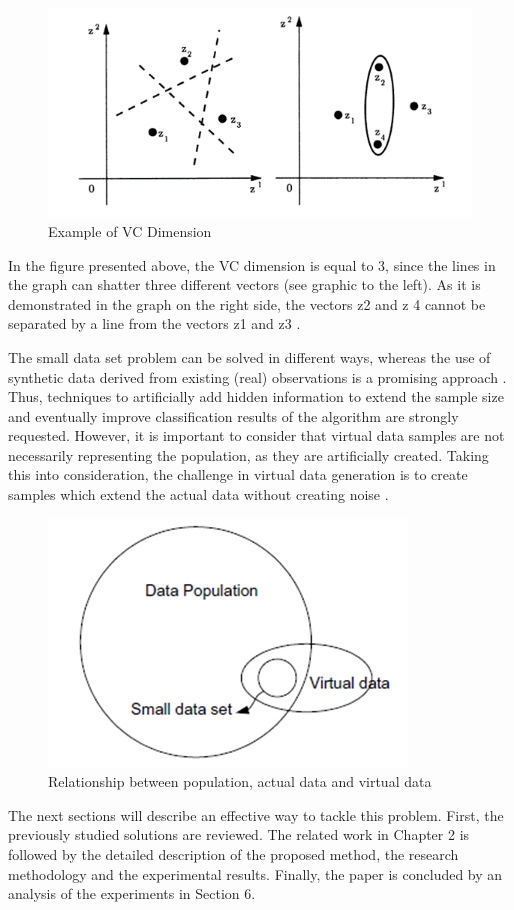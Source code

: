 \documentclass[parskip=full]{scrartcl}
\begin{document}
\begin{figure}[h]
	\centering
	\includegraphics[width=0.6\linewidth]{"./resources/vc_dimension"}
	\caption{Example of VC Dimension \cite{Vapnik.2008}}
	\label{fig:vc_dimension}
\end{figure}

In the figure presented above, the VC dimension is equal to 3, since the lines
in the graph can shatter three different vectors (see graphic to the left). As it is
demonstrated in the graph on the right side, the vectors z{\tiny 2} and z{\tiny
4} cannot be separated by a line from the vectors z{\tiny 1} and z{\tiny 3}
\cite{Vapnik.2008}.

The small data set problem can be solved in different ways, whereas
the use of synthetic data derived from existing (real) observations is a
promising approach \cite{Sezer.2014}. Thus, techniques to artificially add
hidden information to extend the sample size and eventually improve
classification results of the algorithm are strongly requested. However, it is
important to consider that virtual data samples are not necessarily representing
the population, as they are artificially created. Taking this into
consideration, the challenge in virtual data generation is to create samples which
extend the actual data without creating noise \cite{Li.2006}. 

\begin{figure}[h]
	\centering
	\includegraphics[width=0.35\linewidth]{./Resources/relationship}
	\caption{Relationship between population, actual data and virtual data \cite{Li.2006}}
	\label{fig:relationship}
\end{figure}

The next sections will describe an effective way to tackle this problem. First,
the previously studied solutions are reviewed. The related work in Chapter 2 is
followed by the detailed description of the proposed method, the research
methodology and the experimental results. Finally, the paper is concluded by an
analysis of the experiments in Section 6.
\end{document}
